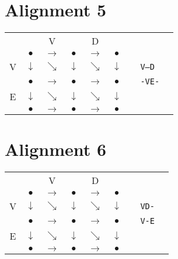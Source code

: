 \documentclass[landscape]{foils}
\begin{document}
\myNewSlide
\section*{Alignment 5}

{
\huge
\begin{center}
\begin{tabular}{cccccccp{1in}c}
   &              & V            &  & D & \\   
   & {\color{red} $\bullet$}      & {\color{red}$\rightarrow$}   & {\color{red} $\bullet$}        &   {\color{black}$\rightarrow$} & {\color{black}$\bullet$} \\
V  & {\color{black} $\downarrow$} & {\color{black}$\searrow$}    & {\color{red} $\downarrow$ } & {\color{black}$\searrow$}    & {\color{black} $\downarrow$ } & & {\tt V--D} \\
   & {\color{black} $\bullet$ }   & {\color{black}$\rightarrow$} & {\color{red} $\bullet$ }   & {\color{black}$\rightarrow$} & {\color{black}  $\bullet$ } & & {\tt -VE-}\\   
E  & {\color{black} $\downarrow$} & {\color{black}$\searrow$}    & {\color{red} $\downarrow$ } & {\color{black}$\searrow$}    & {\color{black} $\downarrow$ }  \\
   & {\color{black} $\bullet$ }   & {\color{black}$\rightarrow$} & {\color{red} $\bullet$ }   & {\color{red}$\rightarrow$} & {\color{red}  $\bullet$ } \\   
\end{tabular}
\end{center}
}

\myNewSlide
\section*{Alignment 6}

{
\huge
\begin{center}
\begin{tabular}{cccccccp{1in}c}
   &              & V            &  & D & \\   
   & {\color{red} $\bullet$}      & {\color{black}$\rightarrow$}   & {\color{black} $\bullet$}        &   {\color{black}$\rightarrow$} & {\color{black}$\bullet$} \\
V  & {\color{black} $\downarrow$} & {\color{red}$\searrow$}    & {\color{black} $\downarrow$ } & {\color{black}$\searrow$}    & {\color{black} $\downarrow$ }  & & {\tt VD-}\\
   & {\color{black} $\bullet$ }   & {\color{black}$\rightarrow$} & {\color{red} $\bullet$ }   & {\color{red}$\rightarrow$} & {\color{red}  $\bullet$ } & & {\tt V-E}\\   
E  & {\color{black} $\downarrow$} & {\color{black}$\searrow$}    & {\color{black} $\downarrow$ } & {\color{black}$\searrow$}    & {\color{red} $\downarrow$ }  \\
   & {\color{black} $\bullet$ }   & {\color{black}$\rightarrow$} & {\color{black} $\bullet$ }   & {\color{black}$\rightarrow$} & {\color{red}  $\bullet$ } \\   
\end{tabular}
\end{center}
}
\end{document}
